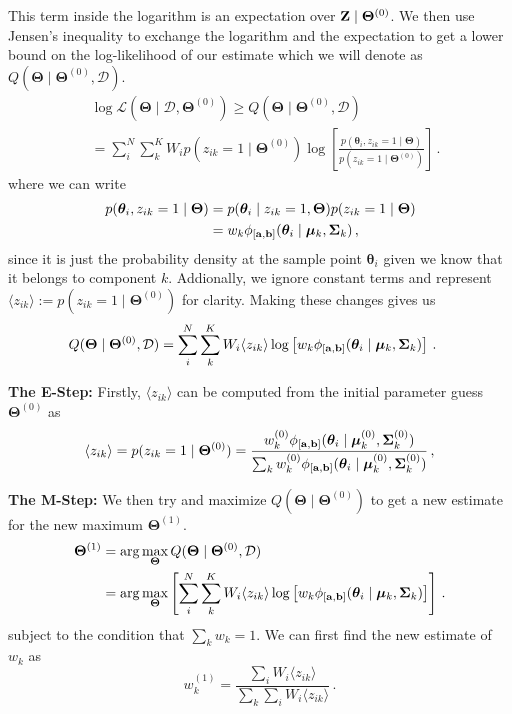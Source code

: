 \documentclass[twocolumn,usenames,dvipsnames,linenumbers]{aastex631}
\newcommand{\btheta}{\boldsymbol{\theta}}
\newcommand{\bmu}{\boldsymbol{\mu}}
\newcommand{\bSigma}{\boldsymbol{\Sigma}}
\newcommand{\ba}{{\bf a}}
\newcommand{\bb}{{\bf b}}
\newcommand{\bZ}{{\bf Z}}
\newcommand{\bTheta}{\boldsymbol{\Theta}}
\newcommand{\zik}{\langle z_{ik}\rangle }
\begin{document}
This term inside the logarithm is an expectation over $\bZ \mid \bTheta^{(0)}$. We then use Jensen's inequality to exchange the logarithm and the expectation to get a lower bound on the log-likelihood of our estimate which we will denote as $Q(\bTheta \mid \bTheta^{(0)}, \mathcal D) $.
\begin{equation}
	\begin{aligned}
		&\log\mathcal{L}(\bTheta \mid \mathcal D, \bTheta^{(0)}) \geq Q(\bTheta \mid \bTheta^{(0)}, \mathcal D) \\ &=  \sum_i^N \sum_k^K W_i p(z_{ik} = 1 \mid \bTheta^{(0)}) \log \left[\frac{p(\btheta_i ,z_{ik} = 1 \mid \bTheta)}{p(z_{ik} = 1 \mid \bTheta^{(0)})} \right]\,.
	\end{aligned}
\end{equation}
where we can write 
\begin{equation}
	\begin{aligned}
	p(\btheta_i ,z_{ik} = 1 \mid \bTheta) &= p(\btheta_i \mid z_{ik} = 1, \bTheta)p(z_{ik} = 1 \mid \bTheta) \\ &= w_k \phi_{[\ba, \bb]}(\btheta_i \mid \bmu_k, \bSigma_k)\,,
	\end{aligned}
\end{equation}
since it is just the probability density at the sample point $\btheta_i$ given we know that it belongs to component $k$. 
Addionally, we ignore constant terms and represent $\zik := p(z_{ik} = 1 \mid \bTheta^{(0)})$ for clarity. Making these changes gives us
\begin{equation}
\begin{aligned}
	Q(\bTheta \mid \bTheta^{(0)}, \mathcal D) &=  \sum_i^N \sum_k^K W_i \zik \log \left[w_k \phi_{[\ba, \bb]}(\btheta_i \mid \bmu_k, \bSigma_k)\right]\,.
\end{aligned}
\end{equation}

\textbf{The E-Step: }Firstly, $\zik$ can be computed from the initial parameter guess $\bTheta^{(0)}$ as
\begin{equation}
	\langle z_{ik}\rangle = p(z_{ik} = 1 \mid \bTheta^{(0)}) = \frac{w^{(0)}_k \phi_{[\ba, \bb]}(\btheta_i \mid \bmu^{(0)}_k, \bSigma^{(0)}_k)}{\sum_k w^{(0)}_k \phi_{[\ba, \bb]}(\btheta_i \mid \bmu^{(0)}_k, \bSigma^{(0)}_k)}\,,
\end{equation}

\textbf{The M-Step: }We then try and maximize $Q(\bTheta \mid \bTheta^{(0)})$ to get a new estimate for the new maximum $\bTheta^{(1)}$.
\begin{equation}
	\begin{aligned}
		\bTheta^{(1)} &= \arg \max_{\bTheta} Q(\bTheta \mid \bTheta^{(0)}, \mathcal D) \\ &= \arg \max_{\bTheta} \left[\sum_i^N \sum_k^K W_i \zik \log \left[w_k \phi_{[\ba, \bb]}(\btheta_i \mid \bmu_k, \bSigma_k)\right]\right]\,.
	\end{aligned}
\end{equation}
subject to the condition that $\sum_k w_k = 1$. We can first find the new estimate of $w_k$ as
\begin{equation}
	w^{(1)}_k = \frac{\sum_{i}W_i\zik}{\sum_k\sum_{i}W_i \zik}\,.
\end{equation}
\end{document}
